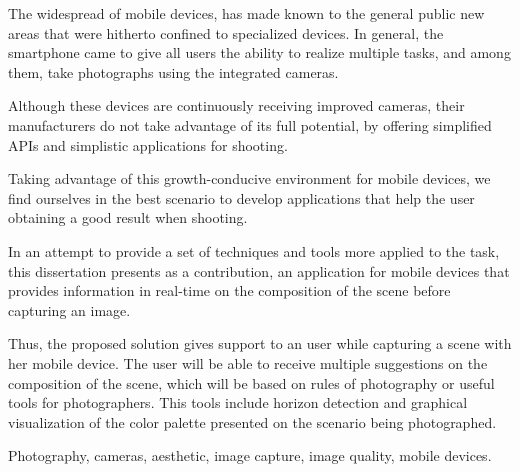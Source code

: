 \abstractEN
The widespread of mobile devices, has made known to the general public new areas that were hitherto confined to specialized devices. In general, the smartphone came to give all users the ability to realize multiple tasks, and among them, take photographs using the integrated cameras.


Although these devices are continuously receiving improved cameras, their manufacturers do not take advantage of its full potential, by offering simplified APIs and simplistic applications for shooting.


Taking advantage of this growth-conducive environment for mobile devices, we find ourselves in the best scenario to develop applications that help the user obtaining a good result when shooting.


In an attempt to provide a set of techniques and tools more applied to the task, this dissertation presents as a contribution, an application for mobile devices that provides information in real-time on the composition of the scene before capturing an image.

Thus, the proposed solution gives support to an user while capturing a scene with her mobile device. The user will be able to receive multiple suggestions on the composition of the scene, which will be based on rules of photography or useful tools for photographers. This tools include horizon detection and graphical visualization of the color palette presented on the scenario being photographed.

\begin{keywords}
Photography, cameras, aesthetic, image capture, image quality, mobile devices.
\end{keywords}

